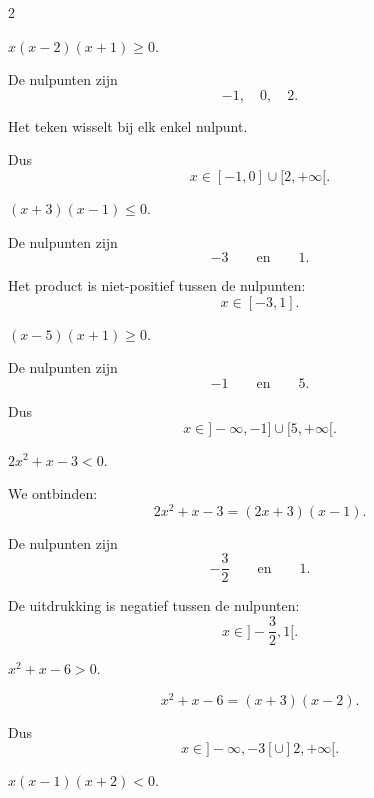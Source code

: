 \documentclass{ximera}
\begin{document}
\begin{oefening}[Tekenschema's]{\oefU\ESS}
\begin{multicols}{2}
\begin{question}
$x(x-2)(x+1)\geq0$.

\begin{oplossing}
De nulpunten zijn
\[
-1,\quad0,\quad2.
\]

Het teken wisselt bij elk enkel nulpunt.

Dus
\[
x\in[-1,0]\cup[2,+\infty[.
\]
\end{oplossing}
\end{question}


\begin{question}
$(x+3)(x-1)\leq0$.

\begin{oplossing}
De nulpunten zijn
\[
-3
\qquad\text{en}\qquad
1.
\]

Het product is niet-positief tussen de nulpunten:
\[
x\in[-3,1].
\]
\end{oplossing}
\end{question}


\begin{question}
$(x-5)(x+1)\geq0$.

\begin{oplossing}
De nulpunten zijn
\[
-1
\qquad\text{en}\qquad
5.
\]

Dus
\[
x\in]-\infty,-1]\cup[5,+\infty[.
\]
\end{oplossing}
\end{question}


\begin{question}
$2x^2+x-3<0$.

\begin{oplossing}
We ontbinden:
\[
2x^2+x-3
=(2x+3)(x-1).
\]

De nulpunten zijn
\[
-\frac32
\qquad\text{en}\qquad
1.
\]

De uitdrukking is negatief tussen de nulpunten:
\[
x\in]-\frac32,1[.
\]
\end{oplossing}
\end{question}


\begin{question}
$x^2+x-6>0$.

\begin{oplossing}
\[
x^2+x-6
=(x+3)(x-2).
\]

Dus
\[
x\in]-\infty,-3[
\cup
]2,+\infty[.
\]
\end{oplossing}
\end{question}


\begin{question}
$x(x-1)(x+2)<0$.


\end{question}
\end{multicols}
\end{oefening}
\end{document}
